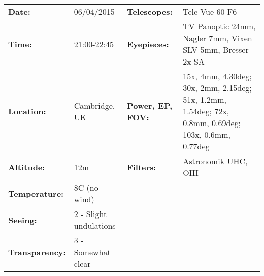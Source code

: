 \begin{tabular}{ p{0.9in} p{1.3in} p{1.2in} p{5.2in}}
{\bf Date:} & 06/04/2015 & {\bf Telescopes:} & Tele Vue 60 F6 \\ 
{\bf Time:} & 21:00-22:45 & {\bf Eyepieces:} & TV Panoptic 24mm, Nagler 7mm, Vixen SLV 5mm, Bresser 2x SA \\ 
{\bf Location:} & Cambridge, UK & {\bf Power, EP, FOV:} & 15x, 4mm, 4.30deg; 30x, 2mm, 2.15deg; 51x, 1.2mm, 1.54deg; 72x, 0.8mm, 0.69deg; 103x, 0.6mm, 0.77deg \\ 
{\bf Altitude:} & 12m & {\bf Filters:} & Astronomik UHC, OIII \\ 
{\bf Temperature:} & 8C (no wind) & & \\ 
{\bf Seeing:} & 2 - Slight undulations & & \\ 
{\bf Transparency:} & 3 - Somewhat clear & & \\ 
\end{tabular}
